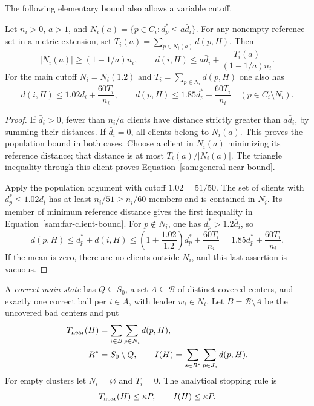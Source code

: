 The following elementary bound also allows a variable cutoff.
\begin{lemma}\label{sam:near-clients}
Let $n_i>0$, $a>1$, and
$N_i(a)=\{p\in C_i:d_p^*\le a\bar d_i\}$.  For any nonempty reference
set in a metric extension, set $T_i(a)=\sum_{p\in N_i(a)}d(p,H)$.
Then
\begin{equation}
 |N_i(a)|\ge(1-1/a)n_i,\qquad
 d(i,H)\le a\bar d_i+
              \frac{T_i(a)}{(1-1/a)n_i}.
 \label{sam:general-near-bound}
\end{equation}
For the main cutoff $N_i=N_i(1.2)$ and
$T_i=\sum_{p\in N_i}d(p,H)$ one also has
\begin{equation}
 d(i,H)\le1.02\bar d_i+\frac{60T_i}{n_i},\qquad
 d(p,H)\le1.85d_p^*+\frac{60T_i}{n_i}\quad(p\in C_i\setminus N_i).
 \label{sam:far-client-bound}
\end{equation}
\end{lemma}

\begin{proof}
If $\bar d_i>0$, fewer than $n_i/a$ clients have distance strictly greater
than $a\bar d_i$, by summing their distances.  If $\bar d_i=0$, all
clients belong to $N_i(a)$.  This proves the population bound in both
cases.  Choose a client in $N_i(a)$ minimizing its reference distance;
that distance is at most $T_i(a)/|N_i(a)|$.  The triangle inequality
through this client proves Equation~\eqref{sam:general-near-bound}.

Apply the population argument with cutoff $1.02=51/50$.  The set of
clients with $d_p^*\le1.02\bar d_i$ has at least $n_i/51\ge n_i/60$
members and is contained in $N_i$.  Its member of minimum reference
distance gives the first inequality in Equation~\eqref{sam:far-client-bound}.
For $p\notin N_i$, one has $d_p^*>1.2\bar d_i$, so
\[
 d(p,H)\le d_p^*+d(i,H)
 \le\left(1+\frac{1.02}{1.2}\right)d_p^*
       +\frac{60T_i}{n_i}
 =1.85d_p^*+\frac{60T_i}{n_i}.
\]
If the mean is zero, there are no clients outside $N_i$, and this last
assertion is vacuous.
\end{proof}

A \emph{correct main state} has $Q\subseteq S_0$, a set
$A\subseteq\mathcal B$ of distinct covered centers, and exactly one
correct ball per $i\in A$, with leader $w_i\in N_i$.
Let $B=\mathcal B\setminus A$ be the uncovered bad centers and put
\begin{equation}
 \begin{split}
 T_{\rm near}(H)&=\sum_{i\in B}\sum_{p\in N_i}d(p,H),\\
 R^*&=S_0\setminus Q,\qquad
 I(H)=\sum_{s\in R^*}\sum_{p\in J_s}d(p,H).
 \end{split}
 \label{sam:stopping-quantities}
\end{equation}
For empty clusters let $N_i=\varnothing$ and $T_i=0$.
The analytical stopping rule is
\begin{equation}
 T_{\rm near}(H)\le\kappa P,
 \qquad I(H)\le\kappa P.
 \label{sam:stopping-rule}
\end{equation}

